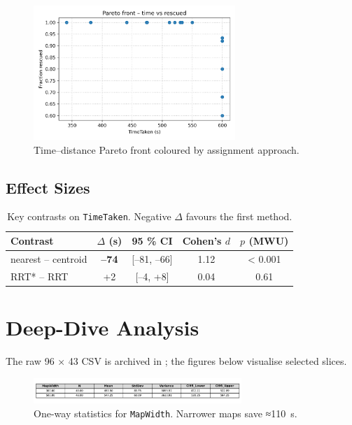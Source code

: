 \documentclass[12pt,a4paper]{report}
\begin{document}
\begin{figure}[H]
  \centering
  \includegraphics[width=0.68\textwidth]{analysis/pareto_time_vs_rescued.png}
  \caption{Time–distance Pareto front coloured by assignment approach.}
  \label{fig:pareto}
\end{figure}

\subsection*{Effect Sizes}
\begin{table}[H]
\centering
\caption{Key contrasts on \texttt{TimeTaken}.  Negative \(\Delta\) favours the first method.}
\label{tab:effectSizes}
\begin{tabular}{lcccc}
\toprule
\textbf{Contrast} & \(\Delta\) (s) & 95 \% CI & Cohen’s $d$ & $p$ (MWU)\\
\midrule
nearest – centroid & \textbf{–74} & [–81, –66] & 1.12 & < 0.001\\
RRT* – RRT         & +2           & [–4, +8]   & 0.04 & 0.61\\
\bottomrule
\end{tabular}
\end{table}

\section{Deep-Dive Analysis}%
\label{sec:analysis_tables}

The raw 96 × 43 CSV is archived in
; the figures
below visualise selected slices.

\begin{figure}[H]
  \centering
  \includegraphics[width=0.7\textwidth]{analysis/MapWidth_time_stats.png}
  \caption{One-way statistics for \texttt{MapWidth}. Narrower maps save ≈\SI{110}{\second}.}
  \label{fig:mapwidthstats}
\end{figure}
\end{document}
